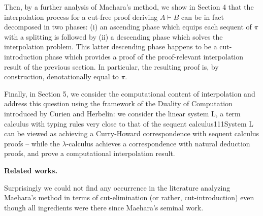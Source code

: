  
 
Then, by a further analysis of Maehara’s method, we show in Section 4 that the interpolation process for a cut-free proof deriving $A\vdash B$ can be in fact decomposed in two phases: (i) an ascending phase which equips each sequent of $\pi$ with a splitting is followed by (ii) a descending phase which solves the interpolation problem. This latter descending phase happens to be a cut-introduction phase which provides a proof of the proof-relevant interpolation result of the previous section. In particular, the resulting proof is, by construction, denotationally equal to $\pi$.\par
 
 
 
Finally, in Section 5, we consider the computational content of interpolation and address this question using the framework of the Duality of Computation introduced by Curien and Herbelin: we consider the linear system L, a term calculus with typing rules very close to that of the sequent calculus111System L can be viewed as achieving a Curry-Howard correspondence with sequent calculus proofs – while the $\lambda$-calculus achieves a correspondence with natural deduction proofs, and prove a computational interpolation result.\par
 
 
 
 
\par\medskip\noindent\textbf{Related works.}\par
 
 
Surprisingly we could not find any occurrence in the literature analyzing Maehara’s method in terms of cut-elimination (or rather, cut-introduction) even though all ingredients were there since Maehara’s seminal work.\par
 
 
 
